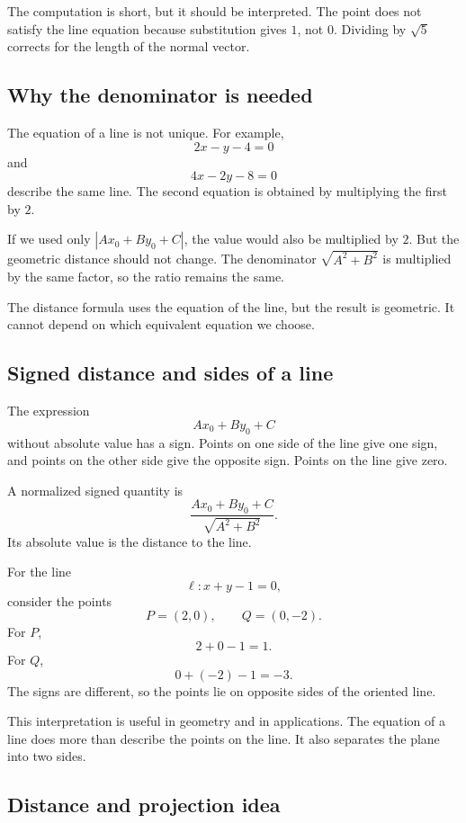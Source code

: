 The computation is short, but it should be interpreted. The point does not satisfy the line equation because substitution gives \(1\), not \(0\). Dividing by \(\sqrt5\) corrects for the length of the normal vector.

\subsection*{Why the denominator is needed}

The equation of a line is not unique. For example,
\[
2x-y-4=0
\]
and
\[
4x-2y-8=0
\]
describe the same line. The second equation is obtained by multiplying the first by \(2\).

If we used only \(|Ax_0+By_0+C|\), the value would also be multiplied by \(2\). But the geometric distance should not change. The denominator \(\sqrt{A^2+B^2}\) is multiplied by the same factor, so the ratio remains the same.

\begin{remarkbox}
The distance formula uses the equation of the line, but the result is geometric. It cannot depend on which equivalent equation we choose.
\end{remarkbox}

\subsection*{Signed distance and sides of a line}

The expression
\[
Ax_0+By_0+C
\]
without absolute value has a sign. Points on one side of the line give one sign, and points on the other side give the opposite sign. Points on the line give zero.

A normalized signed quantity is
\[
\frac{Ax_0+By_0+C}{\sqrt{A^2+B^2}}.
\]
Its absolute value is the distance to the line.

\begin{examplebox}
For the line
\[
\ell: x+y-1=0,
\]
consider the points
\[
P=(2,0),
\qquad
Q=(0,-2).
\]
For \(P\),
\[
2+0-1=1.
\]
For \(Q\),
\[
0+(-2)-1=-3.
\]
The signs are different, so the points lie on opposite sides of the oriented line.
\end{examplebox}

This interpretation is useful in geometry and in applications. The equation of a line does more than describe the points on the line. It also separates the plane into two sides.

\subsection*{Distance and projection idea}

